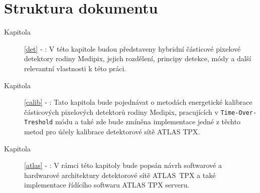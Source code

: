 	
\section{Struktura dokumentu}
\begin{description}
	\item[Kapitola] \ref{det} - :
		V této kapitole budou představeny hybridní částicové pixelové detektory rodiny Medipix, jejich rozdělení, principy detekce, módy a další relevantní vlastnosti k této práci.
	\item[Kapitola] \ref{calib} - :
		Tato kapitola bude pojednávat o metodách energetické kalibrace částicových pixelových detektorů rodiny Medipix, pracujících v \texttt{Time-Over-Treshold} módu a také zde bude zmíněna implementace jedné z těchto metod pro účely kalibrace detektorové sítě ATLAS TPX.
	\item[Kapitola] \ref{atlas} - :
		V rámci této kapitoly bude popsán návrh softwarové a hardwarové architektury detektorové sítě ATLAS~TPX a také implementace řídícího softwaru ATLAS TPX serveru.
\end{description}